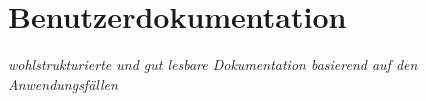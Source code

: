 \chapter{Benutzerdokumentation}
\label{ch:4}

{\em wohlstrukturierte und gut lesbare Dokumentation basierend auf
den Anwendungsf\"allen}
